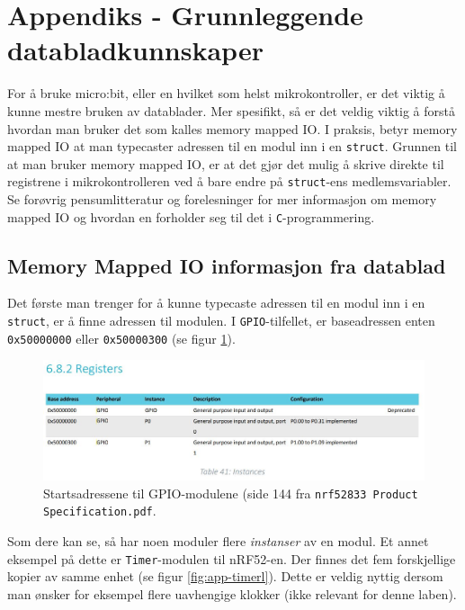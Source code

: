 \appendix


\section{Appendiks - Grunnleggende databladkunnskaper}\label{app:datablad}

For å bruke micro:bit, eller en hvilket som helst mikrokontroller, er det viktig å kunne mestre bruken av datablader. Mer spesifikt, så er det veldig viktig å forstå hvordan man bruker det som kalles memory mapped IO. I praksis, betyr memory mapped IO at man typecaster adressen til en modul inn i en \verb|struct|. Grunnen til at man bruker memory mapped IO, er at det gjør det mulig å skrive direkte til registrene i mikrokontrolleren ved å bare endre på \verb|struct|-ens medlemsvariabler. Se forøvrig pensumlitteratur og forelesninger for mer informasjon om memory mapped IO og hvordan en forholder seg til det i \verb|C|-programmering.

\subsection{Memory Mapped IO informasjon fra datablad}
Det første man trenger for å kunne typecaste adressen til en modul inn i en \verb|struct|, er å finne adressen til modulen. I \verb|GPIO|-tilfellet, er baseadressen enten \verb|0x50000000| eller \verb|0x50000300| (se figur \ref{fig:app-gpio-modul}).


\begin{figure}[ht]
    \centering
    \includegraphics[scale=0.615]{Main/figures/gpio_addresse.JPG}
    \caption{Startsadressene til GPIO-modulene (side 144 fra \texttt{nrf52833 Product Specification.pdf}.}
    \label{fig:app-gpio-modul}
\end{figure}

Som dere kan se, så har noen moduler flere \textit{instanser} av en modul. Et annet eksempel på dette er \verb|Timer|-modulen til nRF52-en. Der finnes det fem forskjellige kopier av samme enhet (se figur \ref{fig:app-timerl}). Dette er veldig nyttig dersom man ønsker for eksempel flere uavhengige klokker (ikke relevant for denne laben).

